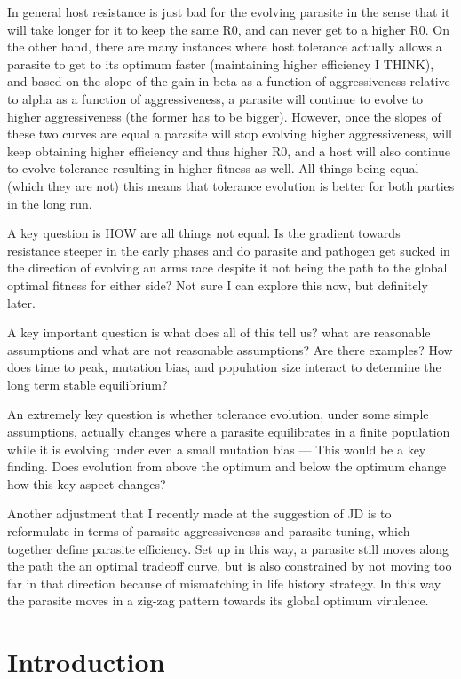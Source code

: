 \documentclass{article}
\begin{document}
In general host resistance is just bad for the evolving parasite in the sense that it will take longer for it to keep the same R0, and can never get to a higher R0. On the other hand, there are many instances where host tolerance actually allows a parasite to get to its optimum faster (maintaining higher efficiency I THINK), and based on the slope of the gain in beta as a function of aggressiveness relative to alpha as a function of aggressiveness, a parasite will continue to evolve to higher aggressiveness (the former has to be bigger). However, once the slopes of these two curves are equal a parasite will stop evolving higher aggressiveness, will keep obtaining higher efficiency and thus higher R0, and a host will also continue to evolve tolerance resulting in higher fitness as well. All things being equal (which they are not) this means that tolerance evolution is better for both parties in the long run. 

A key question is HOW are all things not equal. Is the gradient towards resistance steeper in the early phases and do parasite and pathogen get sucked in the direction of evolving an arms race despite it not being the path to the global optimal fitness for either side? Not sure I can explore this now, but definitely later.

A key important question is what does all of this tell us? what are reasonable assumptions and what are not reasonable assumptions? Are there examples? How does time to peak, mutation bias, and population size interact to determine the long term stable equilibrium? 

An extremely key question is whether tolerance evolution, under some simple assumptions, actually changes where a parasite equilibrates in a finite population while it is evolving under even a small mutation bias --- This would be a key finding. Does evolution from above the optimum and below the optimum change how this key aspect changes?

Another adjustment that I recently made at the suggestion of JD is to reformulate in terms of parasite aggressiveness and parasite tuning, which together define parasite efficiency. Set up in this way, a parasite still moves along the path the an optimal tradeoff curve, but is also constrained by not moving too far in that direction because of mismatching in life history strategy. In this way the parasite moves in a zig-zag pattern towards its global optimum virulence.

\section*{Introduction}
\end{document}
